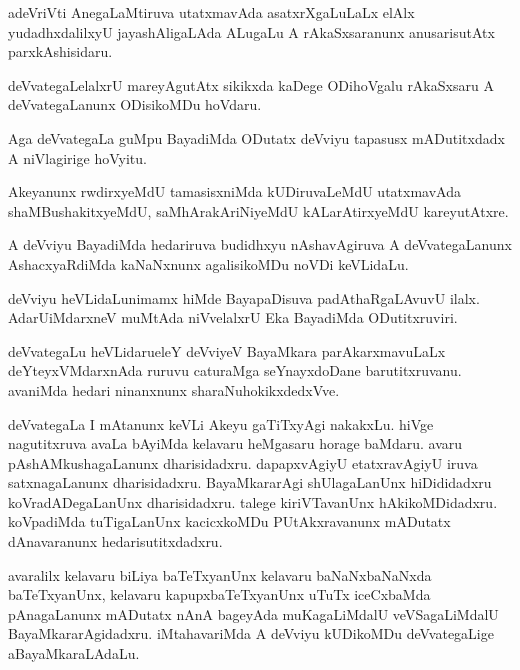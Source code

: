 \begin{mng}
adeVriVti AnegaLaMtiruva utatxmavAda asatxrXgaLuLaLx elAlx yudadhxdalilxyU jayashAligaLAda ALugaLu A rAkaSxsaranunx anusarisutAtx parxkAshisidaru.
\end{mng}

\begin{mng}
deVvategaLelalxrU mareyAgutAtx sikikxda kaDege ODihoVgalu rAkaSxsaru A deVvategaLanunx ODisikoMDu hoVdaru.
\end{mng}

\begin{mng}
Aga deVvategaLa guMpu BayadiMda ODutatx deVviyu tapasusx mADutitxdadx A niVlagirige hoVyitu.
\end{mng}

\begin{mng}
Akeyanunx rwdirxyeMdU tamasisxniMda kUDiruvaLeMdU utatxmavAda shaMBushakitxyeMdU, saMhArakAriNiyeMdU kALarAtirxyeMdU kareyutAtxre.
\end{mng}

\begin{mng}
A deVviyu BayadiMda hedariruva budidhxyu nAshavAgiruva A deVvategaLanunx AshacxyaRdiMda kaNaNxnunx agalisikoMDu noVDi keVLidaLu.
\end{mng}

\begin{mng}
deVviyu heVLidaLu\mdash nimamx hiMde BayapaDisuva padAthaRgaLAvuvU ilalx. AdarUiMdarxneV muMtAda niVvelalxrU Eka BayadiMda ODutitxruviri.
\end{mng}

\begin{mng}
deVvategaLu heVLidaru\mdash eleY deVviyeV BayaMkara parAkarxmavuLaLx deYteyxVMdarxnAda ruruvu caturaMga seYnayxdoDane barutitxruvanu. avaniMda hedari ninanxnunx sharaNuhokikxdedxVve.
\end{mng}

\begin{mng}
deVvategaLa I mAtanunx keVLi Akeyu gaTiTxyAgi nakakxLu. hiVge nagutitxruva avaLa bAyiMda kelavaru heMgasaru horage baMdaru. avaru pAshAMkushagaLanunx dharisidadxru. dapapxvAgiyU etatxravAgiyU iruva satxnagaLanunx dharisidadxru. BayaMkararAgi shUlagaLanUnx hiDididadxru koVradADegaLanUnx dharisidadxru. talege kiriVTavanUnx hAkikoMDidadxru. koVpadiMda tuTigaLanUnx kacicxkoMDu PUtAkxravanunx mADutatx dAnavaranunx hedarisutitxdadxru.
\end{mng}

\begin{mng}
avaralilx kelavaru biLiya baTeTxyanUnx kelavaru baNaNxbaNaNxda baTeTxyanUnx, kelavaru kapupxbaTeTxyanUnx uTuTx iceCxbaMda pAnagaLanunx mADutatx nAnA bageyAda muKagaLiMdalU veVSagaLiMdalU BayaMkararAgidadxru. iMtahavariMda A deVviyu kUDikoMDu deVvategaLige aBayaMkaraLAdaLu.
\end{mng}

